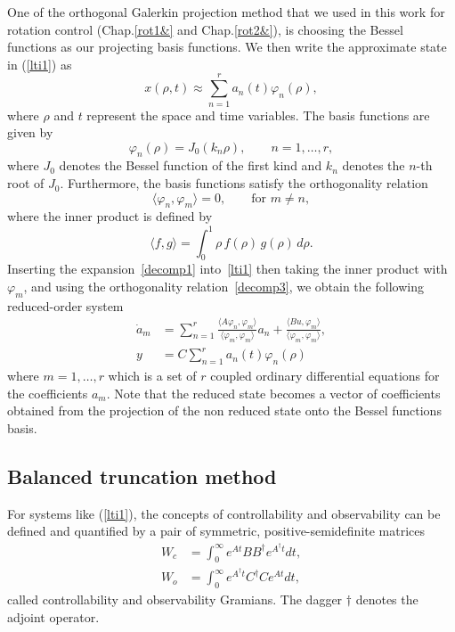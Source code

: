 \documentclass[12pt,lot, lof]{puthesis}
\begin{document}
One of the orthogonal Galerkin projection method that we used in this work for rotation control (Chap.\ref{rot1&} and Chap.\ref{rot2&}), is choosing the Bessel functions as our projecting basis functions. We then write the approximate state in (\ref{lti1}) as
\begin{equation}
x(\rho,t)  \approx \sum_{n=1}^{r} a_n (t) \varphi_n(\rho),
\label{decomp1}
\end{equation}
where $\rho$ and $t$ represent the space and time variables. The basis functions are given by
\begin{equation}
  \label{decomp2}
  \varphi_n(\rho) = J_0(k_n\rho),\qquad n=1,\ldots,r,
\end{equation}
where $J_0$ denotes the Bessel function of the first kind and $k_n$ denotes the $n$-th root of $J_0$. Furthermore, the basis functions satisfy the orthogonality relation
\begin{equation}
  \label{decomp3}
  \langle \varphi_n,\varphi_m\rangle = 0,\qquad \text{for $m\ne n$},
\end{equation}
where the inner product is defined by
\begin{equation}
\langle f,g \rangle =   \int^1 _0 \rho \, f(\rho) \, g(\rho) \, d\rho.
\end{equation}
 Inserting the expansion~\eqref{decomp1} into~\eqref{lti1} then taking the inner product with~$\varphi_m$, and using the orthogonality relation~\eqref{decomp3}, we obtain the following reduced-order system
% 
\begin{equation}
\begin{aligned}
  \dot a_m &= \sum_{n=1}^r \frac{\langle A  \varphi_n,  \varphi_m\rangle}{\langle \varphi_m,\varphi_m\rangle} a_n +\frac{ \langle B u,\varphi_m\rangle}{\langle \varphi_m,\varphi_m\rangle} ,\\
    y &= C \sum_{n=1}^{r} a_n (t) \varphi_n(\rho)
\end{aligned}
\end{equation}
where $ m=1,\ldots,r$ which is a set of $r$ coupled ordinary differential equations for the coefficients $a_m$. Note that the reduced state becomes a vector of coefficients obtained from the projection of the non reduced state onto the Bessel functions basis.

\subsection{Balanced truncation method}
\label{baltrun}

For systems like (\ref{lti1}), the concepts of controllability and observability can be defined and quantified by a pair of symmetric, positive-semidefinite matrices
\begin{subequations}
\begin{align}
W_c  &= \int_0 ^{\infty} e^{At} B B^{\dagger}  e^{A^{\dagger}t} dt, \\
W_o  &= \int_0 ^{\infty} e^{A^\dagger t}  C^\dagger C  e^{At} dt, 
\end{align}
\label{obscontr}
\end{subequations}
called controllability and observability Gramians. The dagger $\dagger$ denotes the adjoint operator. 
\end{document}

